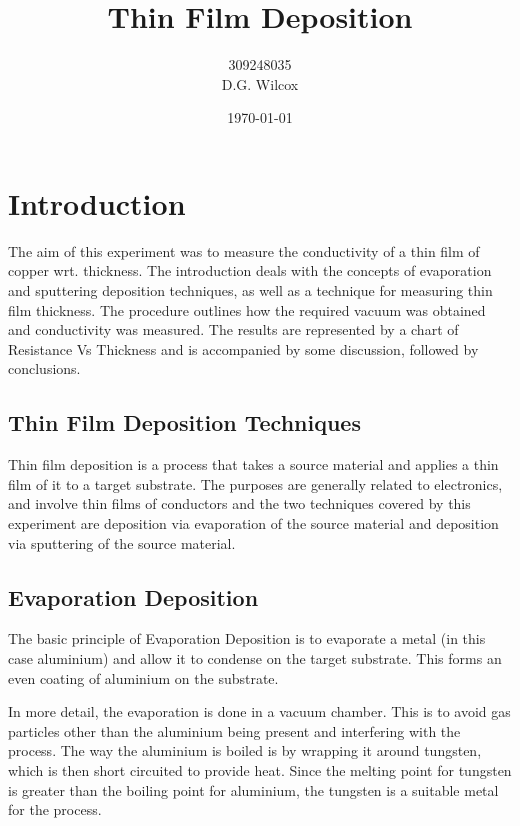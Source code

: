 \documentclass[aps,prl,twocolumn,groupedaddress,showkeys]{revtex4}
\begin{document}
\title{Thin Film Deposition}
\author{309248035 \\
				D.G. Wilcox}

\noaffiliation{}

\date{\today}

\begin{abstract}
\end{abstract}



\maketitle


\section{Introduction}

The aim of this experiment was to measure the conductivity of a thin film of copper wrt. thickness. The introduction deals with the concepts of evaporation and sputtering deposition techniques, as well as a technique for measuring thin film thickness. The procedure outlines how the required vacuum was obtained and conductivity was measured. The results are represented by a chart of Resistance Vs Thickness and is accompanied by some discussion, followed by conclusions.

\subsection{Thin Film Deposition Techniques}

Thin film deposition is a process that takes a source material and applies a thin film of it to a target substrate. The purposes are generally related to electronics, and involve thin films of conductors and the two techniques covered by this experiment are deposition via evaporation of the source material and deposition via sputtering of the source material.

\subsection{Evaporation Deposition}

The basic principle of Evaporation Deposition is to evaporate a metal (in this case aluminium) and allow it to condense on the target substrate. This forms an even coating of aluminium on the substrate. 

In more detail, the evaporation is done in a vacuum chamber. This is to avoid gas particles other than the aluminium being present and interfering with the process. The way the aluminium is boiled is by wrapping it around tungsten, which is then short circuited to provide heat. Since the melting point for tungsten is greater than the boiling point for aluminium, the tungsten is a suitable metal for the process.
\end{document}
